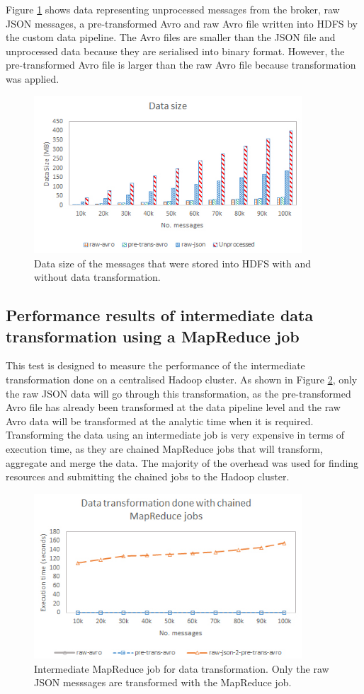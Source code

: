Figure \ref{fig:ds} shows data representing unprocessed messages from the broker, raw JSON messages, a pre-transformed Avro and raw Avro file written into HDFS by the custom data pipeline. The Avro files are smaller than the JSON file and unprocessed data because they are serialised into binary format. However, the pre-transformed Avro file is larger than the raw Avro file because transformation was applied.

\begin{figure}[H]
  \centering
  \includegraphics[width=100mm]{./Figures/data_size.jpg}
  \caption{\small Data size of the messages that were stored into HDFS with and without data transformation.}\label{fig:ds}
\end{figure}


\subsection{Performance results of intermediate data transformation using a MapReduce job} \label{lbl-perf-inter}
This test is designed to measure the performance of the intermediate transformation done on a centralised Hadoop cluster. As shown in Figure \ref{fig:mr_trans}, only the raw JSON data will go through this transformation, as the pre-transformed Avro file has already been transformed at the data pipeline level and the raw Avro data will be transformed at the analytic time when it is required. Transforming the data using an intermediate job is very expensive in terms of execution time, as they are chained MapReduce jobs that will transform, aggregate and merge the data. The majority of the overhead was used for finding resources and submitting the chained jobs to the Hadoop cluster.

\begin{figure}[H]
  \centering
  \includegraphics[width=100mm]{./Figures/mr_trans_perf.jpg}
  \caption{\small Intermediate MapReduce job for data transformation. Only the raw JSON messsages are transformed with the MapReduce job.}\label{fig:mr_trans}
\end{figure}

